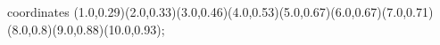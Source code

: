 					coordinates { (1.0,0.29)(2.0,0.33)(3.0,0.46)(4.0,0.53)(5.0,0.67)(6.0,0.67)(7.0,0.71)(8.0,0.8)(9.0,0.88)(10.0,0.93)};